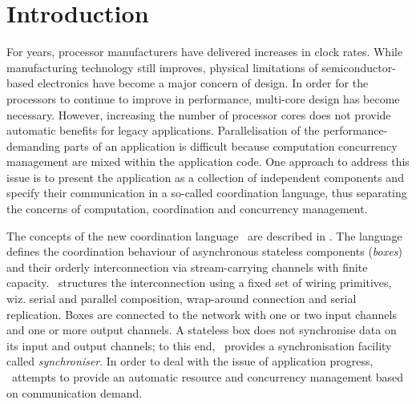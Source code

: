 \chapter{Introduction}
For years, processor manufacturers have delivered increases in clock rates. While manufacturing technology still improves, physical limitations of semiconductor-based electronics have become a major concern of design. In order for the processors to continue to improve in performance, multi-core design has become necessary. However, increasing the number of processor cores does not provide automatic benefits for legacy applications. Parallelisation of the performance-demanding parts of an application is difficult because computation concurrency management are mixed within the application code. 
One approach to address this issue is to present the application as a collection of independent components and specify their communication in a so-called coordination language, thus separating the concerns of computation, coordination and concurrency management.

The concepts of the new coordination language \ak\ are described in \cite{astrakahn}. The language defines the coordination behaviour of asynchronous stateless components (\emph{boxes}) and their orderly interconnection via stream-carrying channels with finite capacity. \ak\ structures the interconnection using a fixed set of wiring primitives, wiz. serial and parallel composition, wrap-around connection and serial replication. Boxes are connected to the network with one or two input channels and one or more output channels. A stateless box does not synchronise data on its input and output channels; to this end, \ak\ provides a synchronisation facility called \emph{synchroniser}. In order to deal with the issue of application progress, \ak\ attempts to provide an automatic resource and concurrency management based on communication demand.



